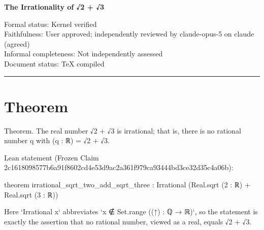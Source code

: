 \documentclass[11pt]{article}
\begin{document}
\begin{center}
{\LARGE\color{HardyBlue}\bfseries The Irrationality of √2 + √3\par}
\vspace{1em}
Formal status: Kernel verified\\
Faithfulness: User approved; independently reviewed by claude-opus-5 on claude (agreed)\\
Informal completeness: Not independently assessed\\
Document status: TeX compiled
\end{center}

\hrule
\vspace{1em}

\section*{Theorem}
Theorem. The real number √2 + √3 is irrational; that is, there is no rational number q with (q : ℝ) = √2 + √3.

Lean statement (Frozen Claim 2c1618098577b6a91f8602cd4e53d9ac2a361f979ca93444bd3ce32d35c4a06b):

    theorem irrational\_sqrt\_two\_add\_sqrt\_three : Irrational (Real.sqrt (2 : ℝ) + Real.sqrt (3 : ℝ))

Here `Irrational x` abbreviates `x ∉ Set.range ((↑) : ℚ → ℝ)`, so the statement is exactly the assertion that no rational number, viewed as a real, equals √2 + √3.
\end{document}
